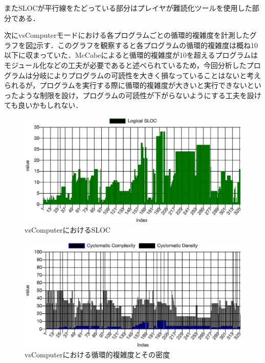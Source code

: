 またSLOCが平行線をたどっている部分はプレイヤが難読化ツールを使用した部分である．

次にvsComputerモードにおける各プログラムごとの循環的複雑度を計測したグラフを図\ref{vsComputer_cyclomatic_complexity}示す．このグラフを観察すると各プログラムの循環的複雑度は概ね10以下に収まっていた．McCabeによると循環的複雑度が10を超えるプログラムはモジュール化などの工夫が必要であると述べられているため，今回分析したプログラムは分岐によりプログラムの可読性を大きく損なっていることはないと考えられるが，プログラムを実行する際に循環的複雑度が大きいと実行できないといったような制限を設け，プログラムの可読性が下がらないようにする工夫を設けても良いかもしれない．


\begin{figure}[H]
  \begin{center}
    \includegraphics[width=0.9\linewidth]{image/vsComputer_sloc.eps}
  \end{center}
    \vspace{-8mm} 
  \caption{vsComputerにおけるSLOC}
  \label{vsComputer_sloc_and_params}
\end{figure}

\begin{figure}[H]
  \begin{center}
    \includegraphics[width=0.9\linewidth]{image/vsComputer_cyclomatic.eps}
  \end{center}
    \vspace{-8mm} 
  \caption{vsComputerにおける循環的複雑度とその密度}
  \label{vsComputer_cyclomatic_complexity}
\end{figure}

